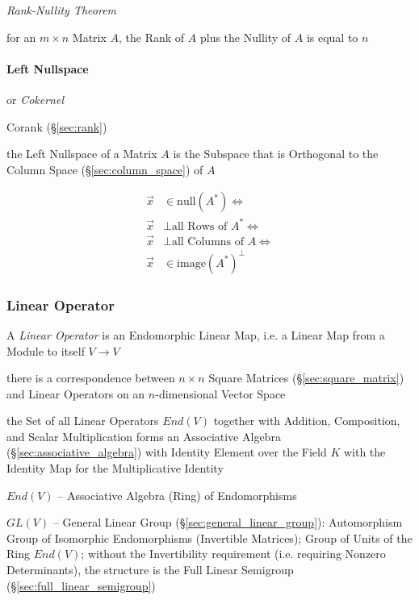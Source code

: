 \emph{Rank-Nullity Theorem}

for an $m \times n$ Matrix $A$, the Rank of $A$ plus the Nullity
of $A$ is equal to $n$



\paragraph{Left Nullspace}\label{sec:left_nullspace}\hfill

or \emph{Cokernel}

Corank (\S\ref{sec:rank})

the Left Nullspace of a Matrix $A$ is the Subspace that is Orthogonal to the
Column Space (\S\ref{sec:column_space}) of $A$

\begin{align*}
  \vec{x} & \in \mathrm{null}(A^*) \Leftrightarrow         \\
  \vec{x} & \bot \text{all Rows of }A^* \Leftrightarrow    \\
  \vec{x} & \bot \text{all Columns of }A \Leftrightarrow   \\
  \vec{x} & \in \mathrm{image}(A^*)^\bot
\end{align*}



\subsubsection{Linear Operator}\label{sec:linear_operator}

A \emph{Linear Operator} is an Endomorphic Linear Map, i.e. a Linear
Map from a Module to itself $V \rightarrow V$

there is a correspondence between $n\times{n}$ Square Matrices
(\S\ref{sec:square_matrix}) and Linear Operators on an $n$-dimensional Vector
Space

the Set of all Linear Operators $End(V)$ together with Addition, Composition,
and Scalar Multiplication forms an Associative Algebra
(\S\ref{sec:associative_algebra}) with Identity Element over the Field $K$ with
the Identity Map for the Multiplicative Identity

$End(V)$ -- Associative Algebra (Ring) of Endomorphisms

$GL(V)$ -- General Linear Group (\S\ref{sec:general_linear_group}):
Automorphism Group of Isomorphic Endomorphisms (Invertible Matrices); Group of
Units of the Ring $End(V)$; without the Invertibility requirement (i.e.
requiring Nonzero Determinants), the structure is the Full Linear Semigroup
(\S\ref{sec:full_linear_semigroup})

